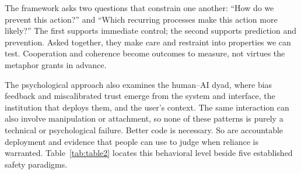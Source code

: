 \documentclass{article}
\begin{document}
The framework asks two questions that constrain one another: ``How do we prevent this action?'' and ``Which recurring processes make this action more likely?'' The first supports immediate control; the second supports prediction and prevention. Asked together, they make care and restraint into properties we can test. Cooperation and coherence become outcomes to measure, not virtues the metaphor grants in advance.

The psychological approach also examines the human--AI dyad, where bias feedback and miscalibrated trust emerge from the system and interface, the institution that deploys them, and the user's context. The same interaction can also involve manipulation or attachment, so none of these patterns is purely a technical or psychological failure. Better code is necessary. So are accountable deployment and evidence that people can use to judge when reliance is warranted. Table~\ref{tab:table2} locates this behavioral level beside five established safety paradigms.
\end{document}

